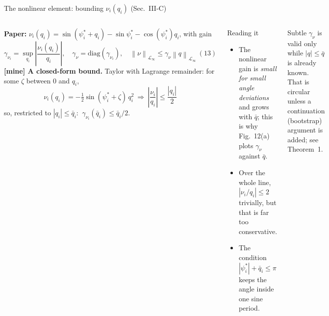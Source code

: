 \documentclass[aspectratio=169,9pt]{beamer}
\newcommand{\norm}[1]{\left\|#1\right\|}
\newcommand{\Linf}{\mathcal{L}_\infty}
\begin{document}
\begin{frame}[t]{The nonlinear element: bounding $\nu_i(q_i)$ (Sec.~III-C)}
\footnotesize
\begin{columns}[T]
\textbf{Paper:} $\nu_i(q_i)=\sin(\psi_i^*+q_i)-\sin\psi_i^*-\cos(\psi_i^*)q_i$, with gain
\[\gamma_{\nu_i}=\sup_{q_i}\left|\frac{\nu_i(q_i)}{q_i}\right|,\quad\gamma_\nu=\mathrm{diag}(\gamma_{\nu_i}),\quad \norm{\nu}_{\Linf}\le\gamma_\nu\norm{q}_{\Linf}\ (13)\]
\textbf{[mine] A closed-form bound.} Taylor with Lagrange remainder: for some $\zeta$ between $0$ and $q_i$,
\[\nu_i(q_i)=-\tfrac12\sin(\psi_i^*+\zeta)\,q_i^2\ \Longrightarrow\ \left|\frac{\nu_i}{q_i}\right|\le\frac{|q_i|}{2}\]
so, restricted to $|q_i|\le\bar q_i$: $\ \gamma_{\nu_i}(\bar q_i)\le\bar q_i/2$.
\begin{block}{Reading it}
\begin{itemize}
\item The nonlinear gain is \emph{small for small angle deviations} and grows with $\bar q$; this is why Fig.~12(a) plots $\gamma_\nu$ against $\bar q$.
\item Over the whole line, $|\nu_i/q_i|\le 2$ trivially, but that is far too conservative.
\item The condition $|\psi^*_i|+\bar q_i\le\pi$ keeps the angle inside one sine period.
\end{itemize}
\end{block}
\begin{alertblock}{Subtle}
$\gamma_\nu$ is valid only while $|q|\le\bar q$ is already known. That is circular unless a continuation (bootstrap) argument is added; see Theorem~1.
\end{alertblock}
\end{columns}
\end{frame}
\end{document}
